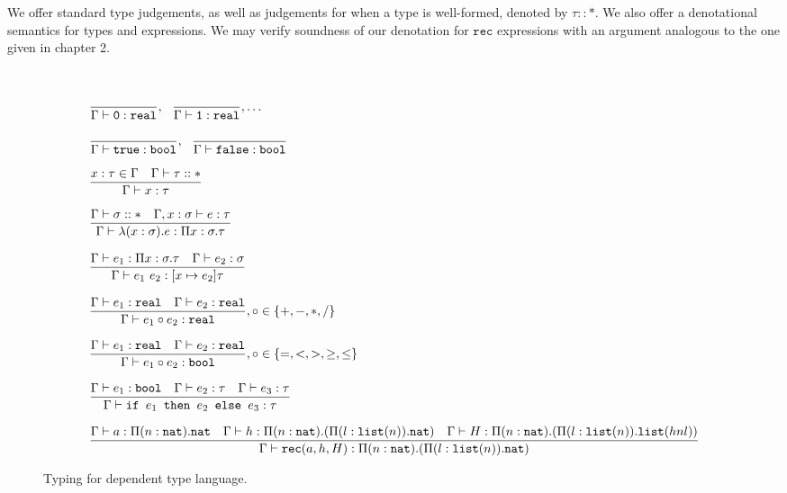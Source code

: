 We offer standard type judgements, as well as judgements for when a type is well-formed, denoted by $\tau :: *$. We 
 also offer a denotational semantics for types and expressions. We may verify soundness of our denotation for
 $\texttt{rec}$ expressions with an argument analogous to the one given in chapter 2. 

\begin{figure}
\[
\begin{array}{lr}
 \\ \\
\dfrac{}{\Gamma \vdash \texttt{0}: \texttt{real}}, \ \ \dfrac{}{\Gamma \vdash \texttt{1}: \texttt{real}}, \ldots \\ \\
\dfrac{}{\Gamma \vdash \texttt{true} : \texttt{bool}}, \ \ \dfrac{}{\Gamma \vdash \texttt{false} : \texttt{bool}} \\  \\
\dfrac{x : \tau \in \Gamma \ \ \ \Gamma \vdash \tau :: *}{\Gamma \vdash x : \tau } \\ \\ 
\dfrac{\Gamma \vdash \sigma :: * \ \ \ \Gamma, x : \sigma \vdash e : \tau}
	{\Gamma \vdash \lambda (x : \sigma).e : \Pi x:\sigma.\tau } \\ \\
\dfrac{\Gamma \vdash e_1: \Pi x:\sigma.\tau \ \ \ \Gamma \vdash e_2 : \sigma}
	{\Gamma \vdash e_1 \ e_2 : [x \mapsto e_2]\tau} \\ \\
\dfrac{\Gamma \vdash e_1 : \texttt{real} \ \ \ \Gamma \vdash e_2 : \texttt{real}}
	{\Gamma \vdash e_1 \circ e_2 : \texttt{real}}
, \circ \in \{+,-,*,/\} \\ \\ 
\dfrac{\Gamma \vdash e_1 : \texttt{real} \ \ \ \Gamma \vdash e_2 : \texttt{real}}
	{\Gamma \vdash e_1 \circ e_2 : \texttt{bool}}
	, \circ \in \{=, <, >, \geq, \leq\} \\ \\ 
\dfrac{\Gamma \vdash e_1 : \texttt{bool} \ \ \ \Gamma \vdash e_2 : \tau \ \ \ \Gamma \vdash e_3 : \tau}
	{\Gamma \vdash \ifelse{e_1}{e_2}{e_3} : \tau} \\ \\ 
\dfrac{\Gamma \vdash a: \Pi (n:\texttt{nat}).\texttt{nat} \ \ \ \Gamma \vdash h: \Pi(n:\texttt{nat}).(\Pi (l:\lst(n)).\texttt{nat}) \ \ \ \Gamma \vdash H: \Pi(n: \texttt{nat}).(\Pi(l : \lst(n)).\lst(h n l))}
	{\Gamma \vdash \texttt{rec}(a, h, H) : \Pi(n:\texttt{nat}).(\Pi (l:\lst(n)).\texttt{nat})}
\end{array}
\]
\caption{Typing for dependent type language.}
\end{figure}


